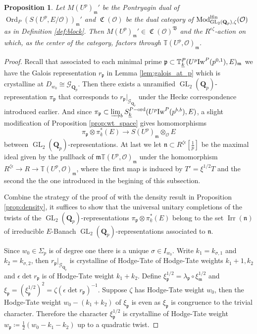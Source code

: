 \documentclass[leqno]{amsart}
\newtheorem{prop}[thm]{Proposition}
\theoremstyle{definition}
\theoremstyle{remark}
\newcommand{\oo}{\mathcal{O}}
\newcommand{\Qp}{\mathbf{Q}_p}
\DeclareMathOperator{\GL}{GL}
\newcommand{\fm}{\mathfrak{m}}
\newcommand{\fn}{\mathfrak{n}}
\newcommand{\fp}{\mathfrak{p}}
\DeclareMathOperator{\Mod}{\textnormal{Mod}}
\DeclareMathOperator{\fC}{\mathfrak{C}} %
\DeclareMathOperator{\Ord}{Ord} %
\DeclareMathOperator{\Irr}{Irr}
\newcommand{\Gp}{\mathcal{G}_{\Qp}} %
\newcommand{\B}{\mathfrak B} %
\newcommand{\lfin}{\textnormal{lfin}}
\newcommand{\wt}[1]{\underline{ #1 }}
\newcommand{\Iw}{\textnormal{Iw}} %
\newcommand{\TT}{\mathbb{T}} %
\newcommand{\ord}{\textnormal{ord}} %
\begin{document}
\begin{prop}\label{prop:compatibility}
    Let  $M(U^p)_{\fm}'$
    be the Pontryagin dual of $\Ord_P(S(U^p,E/\oo))_\fm'$
    and $\fC(\oo)$ be the dual category of
	$\Mod^{\lfin}_{\GL_2(\Qp),\zeta}(\oo)$
    as in Definition \ref{def:block}.
    Then $M(U^p)_{\fm}'\in \fC(\oo)^{\B}$
	and the $R^{\epsilon\zeta}$-action on which,
	as the center of the category,
	factors through $\TT(U^p,\oo)_\fm$.
\end{prop}

\begin{proof}

Recall that associated to each minimal prime
$\fp\subset \TT_{\wt{k}}^P(U^p\Iw^P(p^{0,1}),E)_{\fm}$
we have the Galois representation $r_\fp$
in Lemma \ref{lem:galois_at_p}
which is crystalline at $D_{w_0}\cong\Gp$.
Then there exists a unramified $\GL_2(\Qp)$-representation
$\pi_{\fp}$ that corresponds to $r_\fp\vert_{\Gp}$
under the Hecke correspondence introduced earlier.
And since $\pi_\fp\subset \varinjlim_b 
S^{P-\ord}_{\wt{k}}(U^p\Iw^P(p^{b,b}),E)$,
a slight modification of Proposition \ref{prop:wt_space}
gives homomorphisms
\begin{equation}\label{eq:hom_wt}
    \pi_\fp\otimes \pi_{\wt{k}}^*(E)\to S(U^p)_\fm\otimes_{\oo}E
\end{equation}
between $\GL_2(\Qp)$-representations.
At last we let $\fn\subset R^{\zeta\epsilon}[\frac{1}{p}]$
be the maximal ideal given by the pullback of $\fm\TT(U^p,\oo)_{\fm}$
under the homomorphism
$R^{\zeta\epsilon}\to R\to \TT(U^p,\oo)_{\fm}$,
where the first map is induced by $T'=\xi^{1/2}T$
and the second the the one introduced in the begining of
this subsection.

Combine the strategy of the proof of \cite[Thm 3.5.5]{pan}
with the density result in Proposition \ref{prop:density},
it suffices to show that
the universal unitary completions of
the twists of the $\GL_2(\Qp)$-representations
$\pi_{\fp}\otimes\pi_{\wt{k}}^*(E)$
belong to the set $\Irr(\fn)$
of irreducible $E$-Banach $\GL_2(\Qp)$-representations
associated to $\fn$.

Since $w_0\in \Sigma_p$ is of degree one
there is a unique $\sigma\in I_{w_0}$.
Write $k_1=k_{\sigma,1}$ and $k_2=k_{\sigma,2}$,
then $r_\fp\vert_{\Gp}$ is crystalline of Hodge-Tate
of Hodge-Tate weights  $k_1+1,k_2$
and $\epsilon\det r_{\fp}$
is of Hodge-Tate weight $k_1+k_2$.
Define $\xi_\fp^{1/2}=\lambda_\fp\circ \xi_\fm^{1/2}$
and $\xi_\fp=(\xi_\fp^{1/2})^2=\zeta(\epsilon\det r_\fp)^{-1}$.
Suppose $\zeta$ has Hodge-Tate weight $w_0$,
then the Hodge-Tate weight $w_0-(k_1+k_2)$ of
$\xi_\fp$ is even as $\xi_\fp$
is congruence to the trivial character.
Therefore the character $\xi_{\fp}^{1/2}$
is crystalline of Hodge-Tate weight 
$w_{\fp}\coloneqq \frac{1}{2}(w_0-k_1-k_2)$ 
up to a quadratic twist.


\end{proof}
\end{document}
